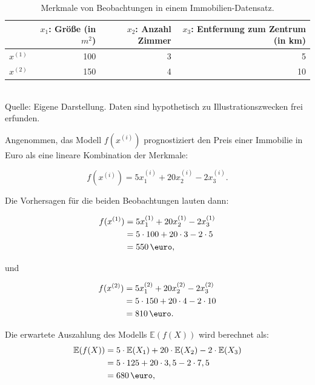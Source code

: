 \begin{table}[!h]
    \caption{Merkmale von Beobachtungen in einem Immobilien-Datensatz.}
    \footnotesize
    \begin{tabularx}{\textwidth}{Xrrr}
    \toprule
     & $x_1$: Größe (in $m^2$) &  $x_2$: Anzahl Zimmer &  $x_3$: Entfernung zum Zentrum (in km) \\
    \midrule
    $x^{(1)}$ & 100 & 3 & 5 \\
    $x^{(2)}$ & 150 & 4 & 10 \\
    \bottomrule
    \end{tabularx}
    \label{tab:example}
    \normalsize\\
    Quelle: Eigene Darstellung. Daten sind hypothetisch zu Illustrationszwecken frei erfunden.
\end{table}

Angenommen, das Modell $f(x^{(i)})$ prognostiziert den Preis einer Immobilie in Euro als eine lineare Kombination der Merkmale:

\begin{equation}
    f(x^{(i)}) = 5x_1^{(i)} + 20x_2^{(i)} - 2x_3^{(i)}.
\end{equation}

Die Vorhersagen für die beiden Beobachtungen lauten dann:

\begin{align}
    \label{eq:fx1}
    f(x^{(1)}) &= 5x_1^{(1)} + 20x_2^{(1)} - 2x_3^{(1)} \\ \notag
        &= 5 \cdot 100 + 20 \cdot 3 - 2 \cdot 5 \\ \notag
        &= 550\,\text{\euro},
\end{align}

und 

\begin{align}
    f(x^{(2)}) &= 5x_1^{(2)} + 20x_2^{(2)} - 2x_3^{(2)} \\ \notag
        &= 5 \cdot 150 + 20 \cdot 4 - 2 \cdot 10 \\ \notag
        &= 810\,\text{\euro}. 
\end{align}

Die erwartete Auszahlung des Modells $\mathbb{E}(f(X))$ wird berechnet als:
\begin{align}
    \label{eq:efx}
    \mathbb{E}(f(X)) &= 5 \cdot \mathbb{E}(X_1) + 20 \cdot \mathbb{E}(X_2) - 2 \cdot \mathbb{E}(X_3) \\ \notag
                     &= 5 \cdot 125 + 20 \cdot 3,5 - 2 \cdot 7,5 \\ \notag
                     &= 680 \,\text{\euro},
\end{align}

